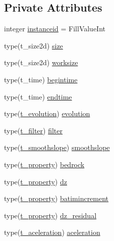 \subsection*{Private Attributes}
\begin{DoxyCompactItemize}
\item 
integer \mbox{\hyperlink{structmodulesand_1_1t__sand_af6d79dd73be5fb4126b776a4a787bd24}{instanceid}} = Fill\+Value\+Int
\item 
type(t\+\_\+size2d) \mbox{\hyperlink{structmodulesand_1_1t__sand_ac1f7de177374d4bb9c79a91d593b666b}{size}}
\item 
type(t\+\_\+size2d) \mbox{\hyperlink{structmodulesand_1_1t__sand_a7ba4fd2f7d96c34bd7cf75c54ded46d3}{worksize}}
\item 
type(t\+\_\+time) \mbox{\hyperlink{structmodulesand_1_1t__sand_a89f7125f78f2a8deef3b07ef05c50760}{begintime}}
\item 
type(t\+\_\+time) \mbox{\hyperlink{structmodulesand_1_1t__sand_ac940ac983fd86ab822963ee2cee5451c}{endtime}}
\item 
type(\mbox{\hyperlink{structmodulesand_1_1t__evolution}{t\+\_\+evolution}}) \mbox{\hyperlink{structmodulesand_1_1t__sand_a17d05228f9d78d37a7888cb3029345d6}{evolution}}
\item 
type(\mbox{\hyperlink{structmodulesand_1_1t__filter}{t\+\_\+filter}}) \mbox{\hyperlink{structmodulesand_1_1t__sand_acab3ea7cfc780cbe7fbe098b04add47a}{filter}}
\item 
type(\mbox{\hyperlink{structmodulesand_1_1t__smoothslope}{t\+\_\+smoothslope}}) \mbox{\hyperlink{structmodulesand_1_1t__sand_a80f1cc6bd42612519caf31db60d455ae}{smoothslope}}
\item 
type(\mbox{\hyperlink{structmodulesand_1_1t__property}{t\+\_\+property}}) \mbox{\hyperlink{structmodulesand_1_1t__sand_a239ab670d57a958ab8d5b3dde93f2820}{bedrock}}
\item 
type(\mbox{\hyperlink{structmodulesand_1_1t__property}{t\+\_\+property}}) \mbox{\hyperlink{structmodulesand_1_1t__sand_a6cc32617386fba115cfc706655ecd3e3}{dz}}
\item 
type(\mbox{\hyperlink{structmodulesand_1_1t__property}{t\+\_\+property}}) \mbox{\hyperlink{structmodulesand_1_1t__sand_a4d6da34f8af8affdcbfa5d57fa497f97}{batimincrement}}
\item 
type(\mbox{\hyperlink{structmodulesand_1_1t__property}{t\+\_\+property}}) \mbox{\hyperlink{structmodulesand_1_1t__sand_ad8cffba747970c7717a71ffc787a24cb}{dz\+\_\+residual}}
\item 
type(\mbox{\hyperlink{structmodulesand_1_1t__aceleration}{t\+\_\+aceleration}}) \mbox{\hyperlink{structmodulesand_1_1t__sand_a846a508ac8380125b523cd195e9ca73c}{aceleration}}

\end{DoxyCompactItemize}
